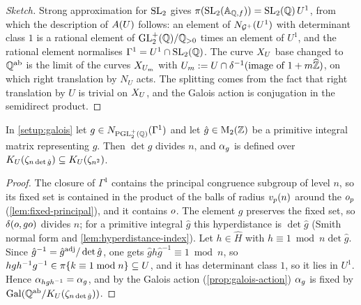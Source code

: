 \begin{proof}[Sketch]
Strong approximation for $\SL{2}{}$ gives
$\AdelicProjection(\SL{2}{\FiniteAdeles{\QQ}}) = \SL{2}{\QQ}\,U^{1}$, from which
the description of $A(U)$ follows: an element of
$N_{\mathcal{G}^{+}}(U^{1})$ with determinant class $1$ is a rational
element of $\mathrm{GL}_{2}^{+}(\mathbb{Q})/\mathbb{Q}_{>0}$ times an element of $U^{1}$, and the
rational element normalises $\Gamma^{1} = U^{1}\cap\SL{2}{\QQ}$. The curve
$X_{U}$ base changed to $\mathbb{Q}^{\mathrm{ab}}$ is the limit of the curves
$X_{U_m}$ with $U_m := U\cap\delta^{-1}(\text{image of }
1 + m\widehat{\mathbb{Z}})$, on which right translation by $N_U$ acts. The
splitting comes from the fact that right translation by $U$ is trivial on
$X_{U}$, and the Galois action is conjugation in the semidirect
product.
\end{proof}


\begin{proposition}
\label{prop:field-of-definition}
In \cref{setup:galois} let $g \in N_{\mathrm{PGL}_{2}^{+}(\mathbb{Q})}(\Gamma^{1})$
and let $\hat g \in \mathrm{M}_{2}(\mathbb{Z})$ be a primitive integral matrix
representing $g$. Then $\det\hat g$ divides $n$, and $\alpha_{g}$ is defined
over $K_{U}(\zeta_{n\det\hat g}) \subseteq
K_{U}(\zeta_{n^{2}})$.
\end{proposition}

\begin{proof}
The closure of $\Gamma^{1}$ contains the principal congruence subgroup of
level $n$, so its fixed set is contained in the product of the balls of
radius $v_{p}(n)$ around the $o_{p}$
(\cref{lem:fixed-principal}), and it contains $o$. The element
$g$ preserves the fixed set, so $\delta(o,go)$
divides $n$; for a primitive integral $\hat g$ this hyperdistance is
$\det\hat g$ (Smith normal form and \cref{lem:hyperdistance-index}). Let
$h \in \hat H$ with $h \equiv 1 \bmod n\det\hat g$. Since
$\hat g^{-1} = \hat g^{\mathrm{adj}}/\det\hat g$, one gets
$\hat g h\hat g^{-1} \equiv 1 \bmod n$, so $hgh^{-1}g^{-1} \in
\pi\{k \equiv 1 \bmod n\} \subseteq U$, and it has
determinant class $1$, so it lies in $U^{1}$. Hence
$\alpha_{hgh^{-1}} = \alpha_{g}$, and by the Galois action
(\cref{prop:galois-action}) $\alpha_{g}$ is fixed by
$\operatorname{Gal}(\mathbb{Q}^{\mathrm{ab}}/K_{U}(\zeta_{n\det\hat g}))$.
\end{proof}

